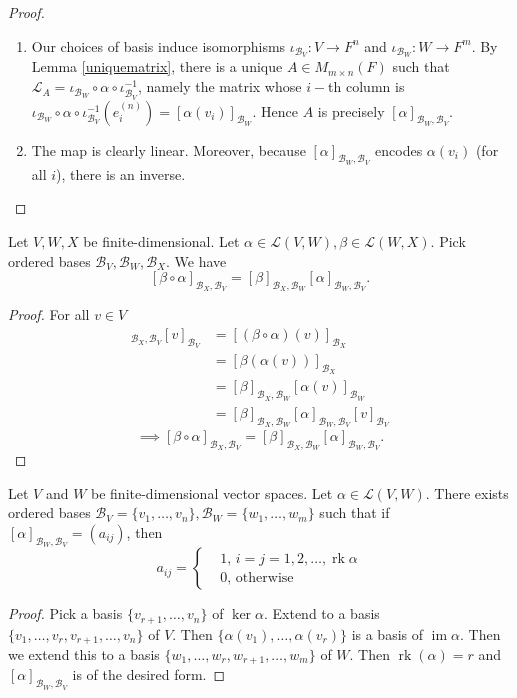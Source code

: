 \documentclass{scrartcl}
\def\L{\mathcal{L}}
\def\B{\mathcal{B}}
\DeclareMathOperator{\im}{im}
\DeclareMathOperator{\rank}{rk}
\begin{document}
\begin{proof}
	\begin{enumerate}
		\item Our choices of basis induce isomorphisms $\iota_{\B_V}: V \to F^n$ and $\iota_{\B_W}: W \to F^m$. By Lemma \ref{uniquematrix}, there is a unique $A \in M_{m \times n}(F)$ such that $\L_A = \iota_{\B_W}\circ\alpha\circ \iota_{\B_V}^{-1}$, namely the matrix whose $i-$th column is $\iota_{\B_W}\circ\alpha \circ\iota_{\B_V}^{-1}(e^{(n)}_i) = [\alpha(v_i)]_{\B_W}$. Hence $A$ is precisely $[\alpha]_{\B_W, \B_V}$. 
		\item The map is clearly linear. Moreover, because $[\alpha]_{\B_W, \B_V}$ encodes $\alpha(v_i)$ (for all $i$), there is an inverse. 
	\end{enumerate}
\end{proof}
\begin{corollary}
	Let $V, W, X$ be finite-dimensional. Let $\alpha \in \L(V, W), \beta \in \L(W, X)$. Pick ordered bases $\B_V, \B_W, \B_X$. We have
	\[[\beta\circ\alpha]_{\B_X, \B_V} = [\beta]_{\B_X, \B_W}[\alpha]_{\B_W, \B_V}.\]
\end{corollary}
\begin{proof}
	For all $v \in V$
	\begin{align*}
		[\beta \circ \alpha]_{\B_X, \B_V}[v]_{\B_V} &= [(\beta \circ \alpha)(v)]_{\B_X} \\
		&= [\beta(\alpha(v))]_{\B_X} \\
		&= [\beta]_{\B_X, \B_W}[\alpha(v)]_{\B_W} \\
		&= [\beta]_{\B_X, \B_W}[\alpha]_{\B_W, \B_V}[v]_{\B_V}
	\end{align*}
	\[\implies [\beta \circ \alpha]_{\B_X, \B_V} = [\beta]_{\B_X, \B_W}[\alpha]_{\B_W, \B_V}.\]
\end{proof}
\begin{proposition}
	Let $V$ and $W$ be finite-dimensional vector spaces. Let $\alpha \in \L(V, W)$. There exists ordered bases $\B_V = \{v_1, \dots, v_n\}, \B_W = \{w_1, \dots, w_m\}$ such that if $[\alpha]_{\B_W, \B_V} = (a_{ij})$, then 
	\[a_{ij} = \left\{
		\begin{aligned}
			&1, \,i=j=1, 2, \dots, \rank{\alpha} \\
			&0, \,\text{otherwise}
		\end{aligned}
		\right.\]
\end{proposition}
\begin{proof}
	Pick a basis $\{v_{r+1}, \dots, v_n\}$ of $\ker{\alpha}$. Extend to a basis $\{v_1, \dots, v_r, v_{r+1}, \dots ,v_n\}$ of $V$. Then $\{\alpha(v_1), \dots, \alpha(v_r)\}$ is a basis of $\im{\alpha}$. Then we extend this to a basis $\{w_1, \dots, w_r, w_{r+1}, \dots ,w_m\}$ of $W$. Then $\rank(\alpha)=r$ and $[\alpha]_{\B_W, \B_V}$ is of the desired form. 
\end{proof}
\end{document}
